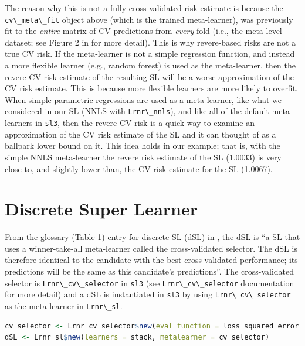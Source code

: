 \documentclass[
  12pt, krantz2,
]{krantz}
\newcommand{\passthrough}[1]{#1}
\newcommand{\1}{\mathbbm{1}}
\theoremstyle{definition}
\theoremstyle{definition}
\theoremstyle{definition}
\theoremstyle{definition}
\theoremstyle{remark}
\begin{document}
The reason why this is not a fully cross-validated risk estimate is because the
\passthrough{\lstinline!cv\_meta\_fit!} object above (which is the trained meta-learner), was previously
fit to the \emph{entire} matrix of CV predictions from \emph{every} fold (i.e., the
meta-level dataset; see Figure 2 in \citet{rvp2022super} for more detail). This is why
revere-based risks are not a true CV risk. If the meta-learner is not a simple
regression function, and instead a more flexible learner (e.g., random
forest) is used as the meta-learner, then the revere-CV risk estimate of the
resulting SL will be a worse approximation of the CV risk estimate. This is
because more flexible learners are more likely to overfit. When simple
parametric regressions are used as a meta-learner, like what we considered in
our SL (NNLS with \passthrough{\lstinline!Lrnr\_nnls!}), and like all of the default meta-learners in
\passthrough{\lstinline!sl3!}, then the revere-CV risk is a quick way to examine an approximation of
the CV risk estimate of the SL and it can thought of as a ballpark lower bound
on it. This idea holds in our example; that is, with the simple NNLS
meta-learner the revere risk estimate of the SL (1.0033)
is very close to, and slightly lower than, the CV risk estimate for the SL
(1.0067).

\hypertarget{discrete-super-learner}{%
\section{Discrete Super Learner}\label{discrete-super-learner}}

From the glossary (Table 1) entry for discrete SL (dSL) in \citet{rvp2022super},
the dSL is ``a SL that uses a winner-take-all meta-learner called
the cross-validated selector. The dSL is therefore identical to the candidate
with the best cross-validated performance; its predictions will be the same as
this candidate's predictions''. The cross-validated selector is
\passthrough{\lstinline!Lrnr\_cv\_selector!} in \passthrough{\lstinline!sl3!} (see \passthrough{\lstinline!Lrnr\_cv\_selector!} documentation for more
detail) and a dSL is instantiated in \passthrough{\lstinline!sl3!} by using \passthrough{\lstinline!Lrnr\_cv\_selector!} as the
meta-learner in \passthrough{\lstinline!Lrnr\_sl!}.

\begin{lstlisting}[language=R]
cv_selector <- Lrnr_cv_selector$new(eval_function = loss_squared_error)
dSL <- Lrnr_sl$new(learners = stack, metalearner = cv_selector)
\end{lstlisting}
\end{document}
